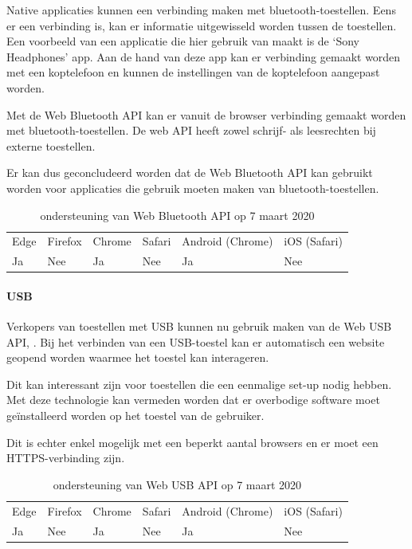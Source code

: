 	Native applicaties kunnen een verbinding maken met bluetooth-toestellen. Eens er een verbinding is, kan er informatie uitgewisseld worden tussen de toestellen. Een voorbeeld van een applicatie die hier gebruik van maakt is de ‘Sony Headphones’ app. Aan de hand van deze app kan er verbinding gemaakt worden met een koptelefoon en kunnen de instellingen van de koptelefoon aangepast worden.
	
	Met de Web Bluetooth API \autocite{Grant2020} kan er vanuit de browser verbinding gemaakt worden met bluetooth-toestellen. De web API heeft zowel schrijf- als leesrechten bij externe toestellen. 
	
	Er kan dus geconcludeerd worden dat de Web Bluetooth API kan gebruikt worden voor applicaties die gebruik moeten maken van bluetooth-toestellen.
	\autocite{Beaufort2019a}
	
	\begin{table}[H]
		\centering
		\begin{tabular}{llllll}
			Edge & Firefox & Chrome & Safari & Android (Chrome) & iOS (Safari) \\
			Ja   & Nee      & Ja     & Nee     & Ja               & Nee          
		\end{tabular}	
		\caption{ondersteuning van Web Bluetooth API op 7 maart 2020}
	\end{table}
	
	
	
	\paragraph{USB}
	
	Verkopers van toestellen met USB kunnen nu gebruik maken van de Web USB API, \autocite{Rockot2020}. Bij het verbinden van een USB-toestel kan er automatisch een website geopend worden waarmee het toestel kan interageren.
	 
	Dit kan interessant zijn voor toestellen die een eenmalige set-up nodig hebben. Met deze technologie kan vermeden worden dat er overbodige software moet geïnstalleerd worden op het toestel van de gebruiker. 
	
	Dit is echter enkel mogelijk met een beperkt aantal browsers en er moet een HTTPS-verbinding zijn.
	\autocite{Beaufort2019b}
	
	\begin{table}[H]
		\centering
		\begin{tabular}{llllll}
			Edge & Firefox & Chrome & Safari & Android (Chrome) & iOS (Safari) \\
			Ja   & Nee      & Ja     & Nee     & Ja               & Nee          
		\end{tabular}	
		\caption{ondersteuning van Web USB API op 7 maart 2020}
	\end{table}
	
